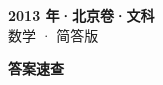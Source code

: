 \documentclass[zihao=-4, a4paper]{ctexart}
\begin{document}
\begin{center}
  {\Large\bfseries 2013 年·北京卷·文科}\\[4pt]
  {\large 数学 · 简答版}
\end{center}
\medskip
{}

\clearpage
{}
\begin{center}{\Large\bfseries 答案速查}\end{center}
\medskip

\end{document}
